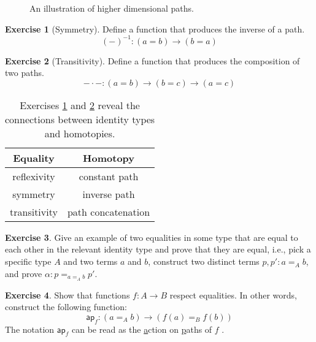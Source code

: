 \documentclass{amsart}
\theoremstyle{definition}
\newtheorem{ex}{Exercise}[section]
\begin{document}
\begin{figure}[h]
    \centering
    
    \caption{An illustration of higher dimensional paths.}
    \label{fig:n-paths}
\end{figure}


\begin{ex}[Symmetry]\label{ex:id-symmetry}
    Define a function that produces the inverse of a path.
    \[
        (-)^{-1} : (a = b) \to (b = a)
    \]
\end{ex}

\begin{ex}[Transitivity]\label{ex:id-transitivity}
    Define a function that produces the composition of two paths.
    \[
        - \cdot - : (a = b) \to (b = c) \to (a = c)
    \]
\end{ex}

\begin{table}[h]
    \centering
    \begin{tabular}{|c|c|}\hline
        Equality & Homotopy \\\hline
        reflexivity & constant path \\\hline
        symmetry & inverse path \\\hline
        transitivity & path concatenation \\\hline
    \end{tabular}
    \caption{Exercises \ref{ex:id-symmetry} and \ref{ex:id-transitivity} reveal the connections between identity types and homotopies.}
    \label{tab:equalities-and-homotopy}
\end{table}

\begin{ex}
    Give an example of two equalities in some type that are equal to each other in the relevant identity type and prove that they are equal, i.e., pick a specific type $A$ and two terms $a$ and $b$, construct two distinct terms $p, p' : a =_A b$, and prove $\alpha : p \mathbf{=}_{a =_A b} p'$.
\end{ex}

\begin{ex}
    Show that functions $f : A \to B$ respect equalities.
    In other words, construct the following function:
    \[
        \mathsf{ap}_{f} : (a =_{A} b) \to (f(a) =_{B} f(b))
    \]
    The notation $\mathsf{ap}_{f}$ can be read as the \underline{a}ction on \underline{p}aths of $f$ \cite{hottbook}.
\end{ex}
\end{document}
